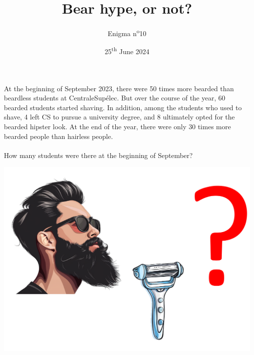 \documentclass[a4paper, top=10mm]{article}
\title{\textbf{\huge{Bear hype, or not?}}}
\author{Enigma n\textsuperscript{o}10}
\date{25\textsuperscript{th} June 2024}
\begin{document}
	\maketitle
	
	\Large
	At the beginning of September 2023, there were 50 times more bearded than beardless students at CentraleSupélec.
	But over the course of the year, 60 bearded students started shaving.
	In addition, among the students who used to shave, 4 left CS to pursue a university degree, and 8 ultimately opted for the bearded hipster look.
	At the end of the year, there were only 30 times more bearded people than hairless people.\\
	\\
	How many students were there at the beginning of September?
	
	\vspace{2cm}
	
	\begin{center}
		\includegraphics[width=\linewidth]{10hype.pdf}
	\end{center}
	
	
\end{document}
